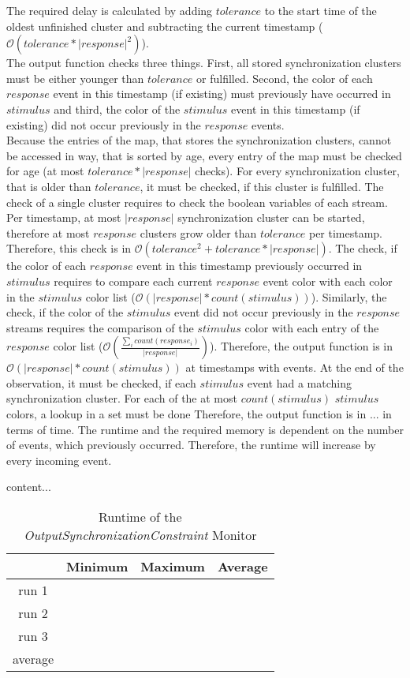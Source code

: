 	The required delay is calculated by adding $tolerance$ to the start time of the oldest unfinished cluster and subtracting the current timestamp ($\mathcal{O}(tolerance*|response|^2)$).\\
	The output function checks three things. First, all stored synchronization clusters must be either younger than $tolerance$ or fulfilled. Second, the color of each $response$ event in this timestamp (if existing) must previously have occurred in $stimulus$ and third, the color of the $stimulus$ event in this timestamp (if existing) did not occur previously in the $response$ events.\\
	Because the entries of the map, that stores the synchronization clusters, cannot be accessed in way, that is sorted by age, every entry of the map must be checked for age (at most $tolerance*|response|$ checks). For every synchronization cluster, that is older than $tolerance$, it must be checked, if this cluster is fulfilled. The check of a single cluster requires to check the boolean variables of each stream. Per timestamp, at most $|response|$ synchronization cluster can be started, therefore at most $response$ clusters grow older than $tolerance$ per timestamp. Therefore, this check is in $\mathcal{O}(tolerance^2+tolerance*|response|)$.
	The check, if the color of each $response$ event in this timestamp previously occurred in $stimulus$ requires to compare each current $response$ event color with each color in the $stimulus$ color list ($\mathcal{O}(|response|*count(stimulus))$). Similarly, the check, if the color of the $stimulus$ event did not occur previously in the $response$ streams requires the comparison of the $stimulus$ color with each entry of the $response$ color list ($\mathcal{O}\left(\frac{\sum_i count(response_i)}{|response|}\right)$). 
	Therefore, the output function is in $\mathcal{O}(|response|*count(stimulus))$ at timestamps with events. At the end of the observation, it must be checked, if each $stimulus$ event had a matching synchronization cluster. For each of the at most $count(stimulus)$ $stimulus$ colors, a lookup in a set must be done%
	Therefore, the output function is in ... in terms of time.
	The runtime and the required memory is dependent on the number of events, which previously occurred. Therefore, the runtime will increase by every incoming event.
	\begin{table}
		content...\begin{tabular}{|c|c|c|c|}
			\hline
			& Minimum & Maximum & Average \\
			\hline
			run 1	&  &  &  \\
			\hline
			run 2	& &  & \\
			\hline
			run 3	&  &  & \\
			\hline
			average & & & \\
			\hline
		\end{tabular}
		\centering
		\label{tab:runtimeOutputSynchronizationConstraint}
		\caption{Runtime of the \emph{OutputSynchronizationConstraint} Monitor}
	\end{table}

